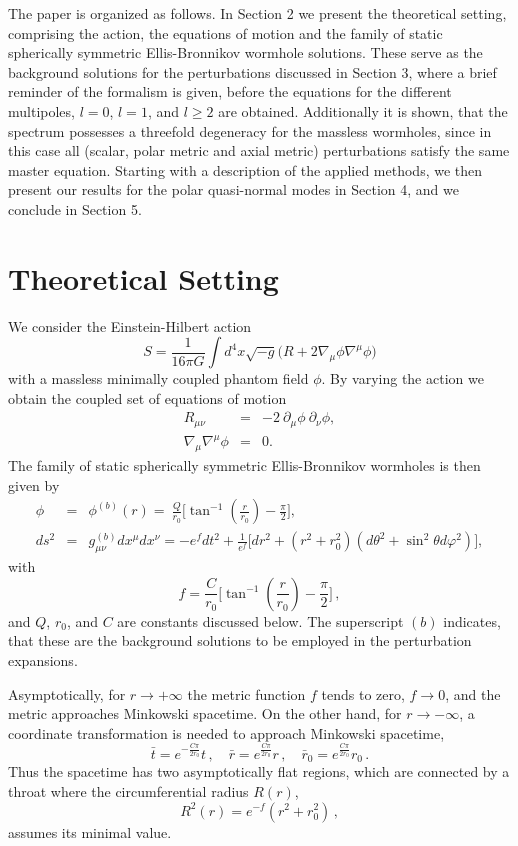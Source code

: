 \documentclass[a4paper,12pt]{article}
\newcommand{\be}{\begin{equation}}
\newcommand{\ee}{\end{equation}}
\newcommand{\bea}{\begin{eqnarray}}
\newcommand{\eea}{\end{eqnarray}}
\begin{document}
The paper is organized as follows. In Section 2 we present the theoretical setting, comprising the action, the equations of motion and the family of static spherically symmetric Ellis-Bronnikov wormhole solutions.
These serve as the background solutions for the perturbations discussed in Section 3, where a brief reminder of the formalism is given, before the equations for the different multipoles, $l=0$, $l=1$, and $l\ge 2$ are obtained.
Additionally it is shown, that the spectrum possesses a threefold degeneracy for the massless wormholes, since in this case all (scalar, polar metric and axial metric)  perturbations satisfy the same master equation.
Starting with a description of the applied methods, we then present our results for the polar quasi-normal modes in Section 4, and we conclude in Section 5.



\section{Theoretical Setting}

We consider the Einstein-Hilbert action
  \be 
  S=\frac{1}{16\pi G}\int d^4x\sqrt{-g}\Big(R+2\nabla_\mu \phi\nabla^{\mu}\phi\Big)
  \ee 
with a massless minimally coupled phantom field $\phi$.
By varying the action we obtain the coupled set of
equations of motion %
  \bea 
   R_{\mu\nu}&=&-2\ \partial_\mu\phi\ \partial_\nu\phi,\\
   \nabla_{\mu}\nabla^{\mu}\phi&=&0.
  \eea 
The family of static spherically symmetric Ellis-Bronnikov wormholes is then given by
  \bea 
  \phi&=& \phi^{(b)}(r) =
  \ \frac{Q}{r_0}\Big[\tan^{-1}\left(\frac{r}{r_0}\right)-\frac{\pi}{2}\Big],\\
   ds^2&=& g_{\mu\nu}^{(b)} dx^{\mu} dx^{\nu} = 
   -e^f dt^2+\frac{1}{e^f}\Big[dr^2+\left(r^2+r_0^2\right)\left(d\theta^2+\sin^2\theta d\varphi^2\right)\Big],
   \eea
with
  \be 
  f=\frac{C}{r_0}\Big[\tan^{-1}\left(\frac{r}{r_0}\right)-\frac{\pi}{2}\Big] \,,
  \ee
  and $Q$, $r_0$, and $C$ are constants discussed below.
  The superscript $(b)$ indicates, that these are the background solutions to be employed in the perturbation expansions.
 
 
  
Asymptotically, for $r \rightarrow +\infty$ the metric function $f$ tends to zero, $f \rightarrow 0$, 
and the metric approaches Minkowski spacetime.  
On the other hand, for $r \rightarrow -\infty$,
a coordinate transformation is needed to approach Minkowski spacetime,
 \begin{equation} \label{coor_trans}
  \bar{t} = e^{-\frac{C \pi}{2 r_0}} t \,, \quad \bar{r} = e^{\frac{C \pi}{2 r_0}} r \,, \quad \bar{r}_0 = e^{\frac{C \pi}{2 r_0}} r_0  \,.
 \end{equation}
Thus the spacetime has two asymptotically flat regions, which are connected by a throat %
where the circumferential radius $R(r)$,
\begin{equation}
R^2(r) = e^{-f}(r^2 + r_0^2) \,,
\end{equation}
assumes its minimal value. %
\end{document}

